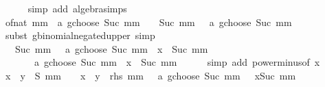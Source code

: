 \begin{isabellebody}
\ \ \ \ \isamarkupfalse%
\ {\isacharparenleft}{\kern0pt}simp\ add{\isacharcolon}{\kern0pt}\ algebra{\isacharunderscore}{\kern0pt}simps{\isacharparenright}{\kern0pt}\isanewline
\ \ \isamarkupfalse%
\ \isamarkupfalse%
\ {\isachardoublequoteopen}{\isacharparenleft}{\kern0pt}of{\isacharunderscore}{\kern0pt}nat\ mm\ {\isacharplus}{\kern0pt}\ a\ gchoose\ {\isacharparenleft}{\kern0pt}Suc\ mm{\isacharparenright}{\kern0pt}{\isacharparenright}{\kern0pt}\ {\isacharequal}{\kern0pt}\ {\isacharparenleft}{\kern0pt}{\isacharminus}{\kern0pt}{}{\isacharparenright}{\kern0pt}\ {\isacharcircum}{\kern0pt}\ {\isacharparenleft}{\kern0pt}Suc\ mm{\isacharparenright}{\kern0pt}\ {\isacharasterisk}{\kern0pt}\ {\isacharparenleft}{\kern0pt}{\isacharminus}{\kern0pt}\ a\ gchoose\ {\isacharparenleft}{\kern0pt}Suc\ mm{\isacharparenright}{\kern0pt}{\isacharparenright}{\kern0pt}{\isachardoublequoteclose}\isanewline
\ \ \ \ \isamarkupfalse%
\ {\isacharparenleft}{\kern0pt}subst\ gbinomial{\isacharunderscore}{\kern0pt}negated{\isacharunderscore}{\kern0pt}upper{\isacharparenright}{\kern0pt}\ simp\isanewline
\ \ \isamarkupfalse%
\ \isamarkupfalse%
\ {\isachardoublequoteopen}{\isacharparenleft}{\kern0pt}{\isacharminus}{\kern0pt}{}{\isacharparenright}{\kern0pt}\ {\isacharcircum}{\kern0pt}\ Suc\ mm\ {\isacharasterisk}{\kern0pt}\ {\isacharparenleft}{\kern0pt}{\isacharminus}{\kern0pt}\ a\ gchoose\ Suc\ mm{\isacharparenright}{\kern0pt}\ {\isacharasterisk}{\kern0pt}\ x\ {\isacharcircum}{\kern0pt}\ Suc\ mm\ {\isacharequal}{\kern0pt}\isanewline
\ \ \ \ \ \ {\isacharparenleft}{\kern0pt}{\isacharminus}{\kern0pt}\ a\ gchoose\ {\isacharparenleft}{\kern0pt}Suc\ mm{\isacharparenright}{\kern0pt}{\isacharparenright}{\kern0pt}\ {\isacharasterisk}{\kern0pt}\ {\isacharparenleft}{\kern0pt}{\isacharminus}{\kern0pt}x{\isacharparenright}{\kern0pt}\ {\isacharcircum}{\kern0pt}\ Suc\ mm{\isachardoublequoteclose}\isanewline
\ \ \ \ \isamarkupfalse%
\ {\isacharparenleft}{\kern0pt}simp\ add{\isacharcolon}{\kern0pt}\ power{\isacharunderscore}{\kern0pt}minus{\isacharbrackleft}{\kern0pt}of\ x{\isacharbrackright}{\kern0pt}{\isacharparenright}{\kern0pt}\isanewline
\ \ \isamarkupfalse%
\ \isamarkupfalse%
\ {\isachardoublequoteopen}{\isacharparenleft}{\kern0pt}x\ {\isacharplus}{\kern0pt}\ y{\isacharparenright}{\kern0pt}\ {\isacharasterisk}{\kern0pt}\ S\ mm\ {\isacharplus}{\kern0pt}\ {\isasymdots}\ {\isacharequal}{\kern0pt}\ {\isacharparenleft}{\kern0pt}x\ {\isacharplus}{\kern0pt}\ y{\isacharparenright}{\kern0pt}\ {\isacharasterisk}{\kern0pt}\ {\isacharquery}{\kern0pt}rhs\ mm\ {\isacharplus}{\kern0pt}\ {\isacharparenleft}{\kern0pt}{\isacharminus}{\kern0pt}\ a\ gchoose\ {\isacharparenleft}{\kern0pt}Suc\ mm{\isacharparenright}{\kern0pt}{\isacharparenright}{\kern0pt}\ {\isacharasterisk}{\kern0pt}\ {\isacharparenleft}{\kern0pt}{\isacharminus}{\kern0pt}\ x{\isacharparenright}{\kern0pt}{\isacharcircum}{\kern0pt}Suc\ mm{\isachardoublequoteclose}\isanewline

\end{isabellebody}
